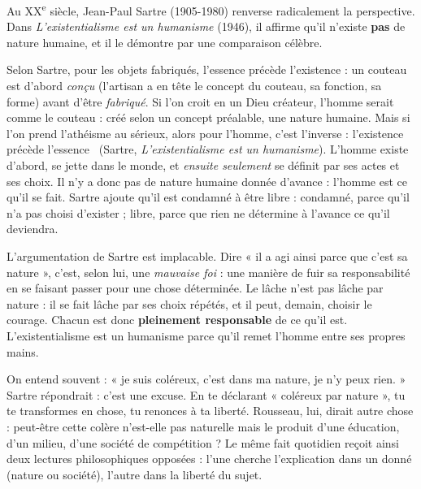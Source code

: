 \documentclass[11pt]{article}
\begin{document}
Au XX\textsuperscript{e} siècle, Jean-Paul Sartre (1905-1980) renverse radicalement la perspective. Dans \emph{L'existentialisme est un humanisme} (1946), il affirme qu'il n'existe \textbf{pas} de nature humaine, et il le démontre par une comparaison célèbre.

\begin{propriete}
Selon Sartre, pour les objets fabriqués, l'essence précède l'existence : un couteau est d'abord \emph{conçu} (l'artisan a en tête le concept du couteau, sa fonction, sa forme) avant d'être \emph{fabriqué}. Si l'on croit en un Dieu créateur, l'homme serait comme le couteau : créé selon un concept préalable, une nature humaine. Mais si l'on prend l'athéisme au sérieux, alors pour l'homme, c'est l'inverse : \guillemotleft l'existence précède l'essence \guillemotright\ (Sartre, \emph{L'existentialisme est un humanisme}). L'homme existe d'abord, se jette dans le monde, et \emph{ensuite seulement} se définit par ses actes et ses choix. Il n'y a donc pas de nature humaine donnée d'avance : l'homme est ce qu'il se fait. Sartre ajoute qu'il est \guillemotleft condamné à être libre \guillemotright : condamné, parce qu'il n'a pas choisi d'exister ; libre, parce que rien ne détermine à l'avance ce qu'il deviendra.
\end{propriete}

L'argumentation de Sartre est implacable. Dire « il a agi ainsi parce que c'est sa nature », c'est, selon lui, une \emph{mauvaise foi} : une manière de fuir sa responsabilité en se faisant passer pour une chose déterminée. Le lâche n'est pas lâche par nature : il se fait lâche par ses choix répétés, et il peut, demain, choisir le courage. Chacun est donc \textbf{pleinement responsable} de ce qu'il est. L'existentialisme est un humanisme parce qu'il remet l'homme entre ses propres mains.

\begin{exemplebox}
On entend souvent : « je suis coléreux, c'est dans ma nature, je n'y peux rien. » Sartre répondrait : c'est une excuse. En te déclarant « coléreux par nature », tu te transformes en chose, tu renonces à ta liberté. Rousseau, lui, dirait autre chose : peut-être cette colère n'est-elle pas naturelle mais le produit d'une éducation, d'un milieu, d'une société de compétition ? Le même fait quotidien reçoit ainsi deux lectures philosophiques opposées : l'une cherche l'explication dans un donné (nature ou société), l'autre dans la liberté du sujet.
\end{exemplebox}
\end{document}
